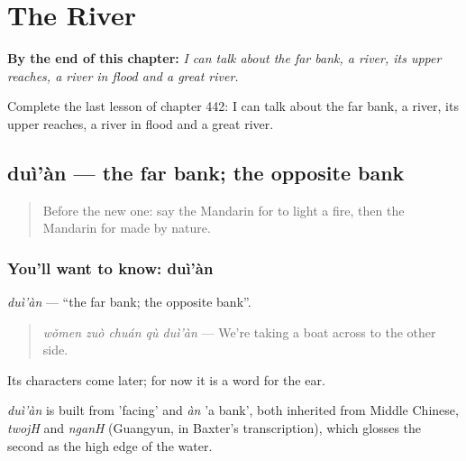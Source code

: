 
\chapter{The River}
\label{ch:zh-the-river}

\begin{chapteropening}
\textbf{By the end of this chapter:} \emph{I can talk about the far bank, a river, its upper reaches, a river in flood and a great river.}

Complete the last lesson of chapter 442: I can talk about the far bank, a river, its upper reaches, a river in flood and a great river.
\end{chapteropening}

\section[duì'àn]{duì'àn — the far bank; the opposite bank}

\label{lesson:ZH-C442-duian}



\begin{quote}
Before the new one: say the Mandarin for to light a fire, then the Mandarin for made by nature.
\end{quote}

\subsection*{You'll want to know: duì'àn}
\emph{duì'àn} — \textquotedblleft{}the far bank; the opposite bank\textquotedblright{}.

\begin{quote}
\emph{wǒmen zuò chuán qù duì'àn} — We're taking a boat across to the other side.
\end{quote}

Its characters come later; for now it is a word for the ear.

\begin{cousinweb}
\emph{duì'àn} is built from  'facing' and \emph{àn} 'a bank', both inherited from Middle Chinese, \emph{twojH} and \emph{nganH} (Guangyun, in Baxter's transcription), which glosses the second as the high edge of the water.
\end{cousinweb}

